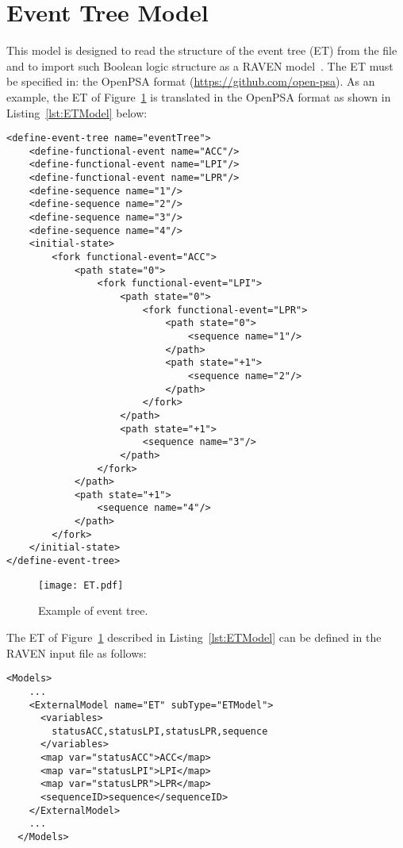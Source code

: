 \section{Event Tree Model}
\label{sec:ETModel}

This model is designed to read the structure of the event tree (ET) from the file and to
import such Boolean logic structure as a RAVEN model~\cite{RAVEN,RAVENtheoryMan}.
The ET must be specified in: the OpenPSA format (\href{<url>}{https://github.com/open-psa}).
As an example, the ET of Figure~\ref{fig:ET} is translated in the OpenPSA format as shown in Listing~\ref{lst:ETModel} below:

\begin{lstlisting}[style=XML,morekeywords={anAttribute},caption=ET of Figure~\ref{fig:ET} in the OpenPSA format., label=lst:ETModel]
<define-event-tree name="eventTree">
    <define-functional-event name="ACC"/>
    <define-functional-event name="LPI"/>
    <define-functional-event name="LPR"/>
    <define-sequence name="1"/>
    <define-sequence name="2"/>
    <define-sequence name="3"/>
    <define-sequence name="4"/>
    <initial-state>
        <fork functional-event="ACC">
            <path state="0">
                <fork functional-event="LPI">
                    <path state="0">
                        <fork functional-event="LPR">
                            <path state="0">
                                <sequence name="1"/>
                            </path>
                            <path state="+1">
                                <sequence name="2"/>
                            </path>
                        </fork>
                    </path>
                    <path state="+1">
                        <sequence name="3"/>
                    </path>
                </fork>
            </path>
            <path state="+1">
                <sequence name="4"/>
            </path>
        </fork>
    </initial-state>
</define-event-tree>
\end{lstlisting}

\begin{figure}
    \centering
    \centerline{\texttt{[image: ET.pdf]}}
    \caption{Example of event tree.}
    \label{fig:ET}
\end{figure}

The ET of Figure~\ref{fig:ET} described in Listing~\ref{lst:ETModel} can be defined in the RAVEN input file as follows:
\begin{lstlisting}[style=XML,morekeywords={anAttribute},caption=ET model input example., label=lst:ET_InputExample]
  <Models>
    ...
    <ExternalModel name="ET" subType="ETModel">
      <variables>
        statusACC,statusLPI,statusLPR,sequence
      </variables>
      <map var="statusACC">ACC</map>
      <map var="statusLPI">LPI</map>
      <map var="statusLPR">LPR</map>
      <sequenceID>sequence</sequenceID>
    </ExternalModel>
    ...
  </Models>
\end{lstlisting}

